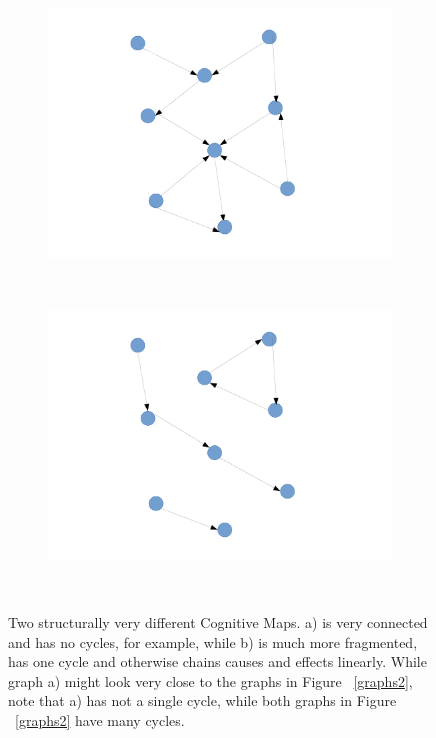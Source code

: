 \documentclass[12pt]{article}
\begin{document}
\begin{figure}
        \centering
        \begin{subfigure}[A]{0.7\textwidth}
                \centering
                \includegraphics[width=\textwidth]{GraphA.pdf}
                \subcaption{}
                \label{grapha}
        \end{subfigure}%
        ~ %
        \begin{subfigure}[B]{0.7\textwidth}
                \centering
                \includegraphics[width=\textwidth]{GraphB.pdf}
                \subcaption{}
                \label{graphb}
        \end{subfigure}
        ~ %
        \caption{Two structurally very different Cognitive Maps. a) is very connected and has no cycles, for example, while b) is much more fragmented, has one cycle and otherwise chains causes and effects linearly. While graph a) might look very close to the graphs in Figure ~\ref{graphs2}, note that a) has not a single cycle, while both graphs in Figure ~\ref{graphs2} have many cycles.}\label{graphs1}
\end{figure}
\end{document}
